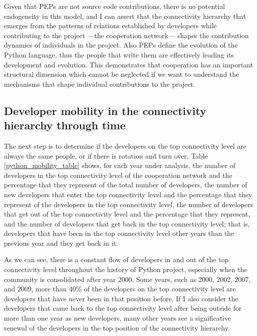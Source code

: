 Given that PEPs are not source code contributions, there is no potential endogeneity in this model, and I can assert that the connectivity hierarchy that emerges from the patterns of relations established by developers while contributing to the project ---the cooperation network--- shapes the contribution dynamics of individuals in the project. Also PEPs define the evolution of the Python language, thus the people that write them are effectively leading its development and evolution. This demonstrates that cooperation has an important structural dimension which cannot be neglected if we want to understand the mechanisms that shape individual contributions to the project.

\subsection{Developer mobility in the connectivity hierarchy through time}

The next step is to determine if the developers on the top connectivity level are always the same people, or if there is rotation and turn over. Table \ref{python_mobility_table} shows, for each year under analysis, the number of developers in the top connectivity level of the cooperation network and the percentage that they represent of the total number of developers, the number of new developers that enter the top connectivity level and the percentage that they represent of the developers in the top connectivity level, the number of developers that get out of the top connectivity level and the percentage that they represent, and the number of developers that get back in the top connectivity level; that is, developers that have been in the top connectivity level other years than the previous year and they get back in it.



As we can see, there is a constant flow of developers in and out of the top connectivity level throughout the history of Python project, especially when the community is consolidated after year 2000. Some years, such as 2000, 2002, 2007, and 2009, more than 40\% of the developers on the top connectivity level are developers that have never been in that position before. If I also consider the developers that came back to the top connectivity level after being outside for more than one year as new developers, many other years see a significative renewal of the developers in the top position of the connectivity hierarchy.

